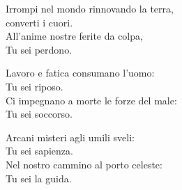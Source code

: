 

\spazio

\strofa Irrompi nel mondo rinnovando la terra,\\
converti i cuori.\\
All'anime nostre ferite da colpa,\\
Tu sei perdono.

\spazio


\spazio

\strofa Lavoro e fatica consumano l'uomo:\\
Tu sei riposo.\\
Ci impegnano a morte le forze del male:\\
Tu sei soccorso.

\spazio


\spazio

\strofa Arcani misteri agli umili sveli:\\
Tu sei sapienza.\\
Nel nostro cammino al porto celeste:\\
Tu sei la guida.

\spazio

